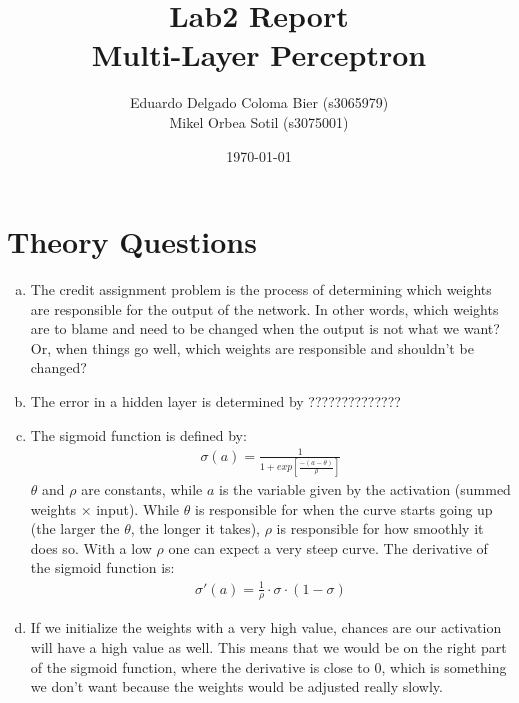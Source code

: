 \documentclass{article}
\title{Lab2 Report \\ {\Large Multi-Layer Perceptron
}}
\date{\today}
\author{
  Eduardo Delgado Coloma Bier (s3065979) \\ 
  Mikel Orbea Sotil (s3075001)
}
\begin{document}
\maketitle

\pagebreak {}

\section{Theory Questions}
\begin{enumerate}[a)]
 \item The credit assignment problem is the process of determining which weights are responsible for the output of the network. In other words, which weights are to blame and need to be changed when the output is not what we want? Or, when things go well, which weights are responsible and shouldn't be changed?

\item The error in a hidden layer is determined by ??????????????

\item The sigmoid function is defined by:
    \begin{equation}
        \begin{gathered}
            \sigma (a) = \frac{1}{1 + exp[\frac{-(a - \theta)}{\rho}]}
        \end{gathered}
    \end{equation}
    $\theta$ and $\rho$ are constants, while $a$ is the variable given by the activation (summed weights $\times$ input). While $\theta$ is responsible for when the curve starts going up (the larger the $\theta$, the longer it takes), $\rho$ is responsible for how smoothly it does so. With a low $\rho$ one can expect a very steep curve. 
    The derivative of the sigmoid function is:
    \begin{equation}
        \begin{gathered}
            \sigma' (a) = \frac{1}{\rho} \cdot \sigma \cdot (1 - \sigma)
        \end{gathered}
    \end{equation}
    
    

\item If we initialize the weights with a very high value, chances are our activation will have a high value as well. This means that we would be on the right part of the sigmoid function, where the derivative is close to 0, which is something we don't want because the weights would be adjusted really slowly.


\end{enumerate}
\end{document}
